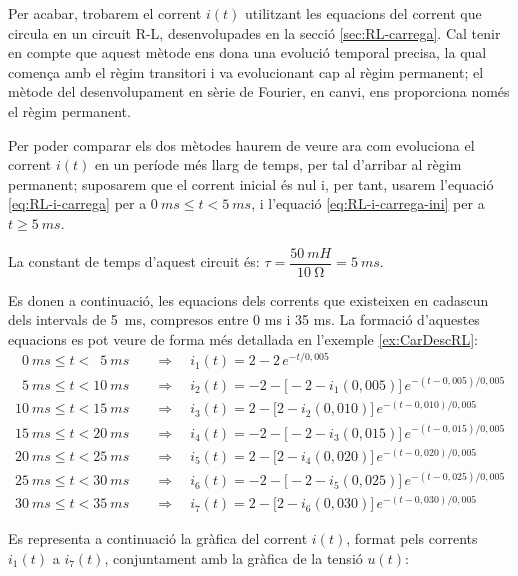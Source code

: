 \begin{exemple}
    Per acabar, trobarem el corrent $i(t)$ utilitzant les equacions del corrent que circula en un circuit R-L, desenvolupades en la secció \vref{sec:RL-carrega}. Cal tenir en compte que aquest mètode ens dona una evolució temporal precisa, la qual comença amb el règim transitori i va evolucionant cap al règim permanent; el mètode del desenvolupament en sèrie de Fourier, en canvi, ens proporciona només el règim permanent.

    Per  poder comparar els dos mètodes haurem de veure  ara com evoluciona el corrent $i(t)$ en un període més llarg de temps, per tal d'arribar al règim permanent; suposarem que el corrent inicial és nul i, per tant, usarem l'equació \eqref{eq:RL-i-carrega} per a $\qty{0}{ms} \leq t < \qty{5}{ms}$, i l'equació \eqref{eq:RL-i-carrega-ini} per a $t \geq \qty{5}{ms}$.

    La constant de temps d'aquest circuit és: $\tau = \dfrac{\qty{50}{mH}}{\qty{10}{\ohm}} = \qty{5}{ms}$.


    Es donen a continuació, les equacions dels corrents que existeixen en cadascun dels intervals de \qty{5}{ms}, compresos entre 0 ms i 35 ms. La formació d'aquestes equacions es pot veure de forma més detallada en l'exemple \vref{ex:CarDescRL}:
    \begin{align*}
      \phantom{0}\qty{0}{ms} \leq t < \phantom{0}\qty{5}{ms}  & \quad\Rightarrow\quad i_1(t) = 2 - 2 \,e^{-t/0,005} \\
      \phantom{0}\qty{5}{ms} \leq t < \qty{10}{ms} & \quad\Rightarrow\quad i_2(t) = -2 - \big[-2 - i_1(0,005)\big]\, e^{-(t-0,005)/0,005}  \\
      \qty{10}{ms}\leq t < \qty{15}{ms} & \quad\Rightarrow\quad i_3(t) = 2 - \big[2 - i_2(0,010)\big]\, e^{-(t-0,010)/0,005} \\
      \qty{15}{ms} \leq t < \qty{20}{ms} & \quad\Rightarrow\quad i_4(t) = -2 - \big[-2 - i_3(0,015)\big]\, e^{-(t-0,015)/0,005}  \\
      \qty{20}{ms}\leq t < \qty{25}{ms} & \quad\Rightarrow\quad i_5(t) = 2 - \big[2 - i_4(0,020)\big]\, e^{-(t-0,020)/0,005} \\
      \qty{25}{ms} \leq t < \qty{30}{ms} & \quad\Rightarrow\quad i_6(t) = -2 - \big[-2 - i_5(0,025)\big]\, e^{-(t-0,025)/0,005}  \\
      \qty{30}{ms}\leq t < \qty{35}{ms} & \quad\Rightarrow\quad i_7(t) = 2 - \big[2 - i_6(0,030)\big]\, e^{-(t-0,030)/0,005}
    \end{align*}

    Es representa a continuació la gràfica del corrent $i(t)$, format pels corrents $i_1(t)$ a $i_7(t)$, conjuntament amb la gràfica de la tensió $u(t)$:
    \begin{center}
      
    \end{center}


\end{exemple}
